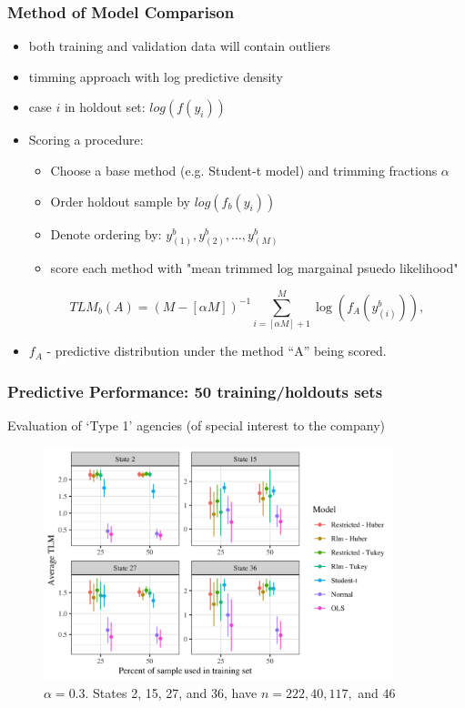 \documentclass{beamer}
\begin{document}
\begin{frame}
	\frametitle{Method of Model Comparison}
\begin{itemize}
	\item both training and validation data will contain outliers
	\item timming approach with log predictive density \citep{jung2014}
	\item case $i$ in holdout set: $log(f(y_i))$
	\item Scoring a procedure:
	\begin{itemize}
		\item Choose a base method (e.g. Student-t model) and trimming fractions $\alpha$
		\item Order holdout sample by $log(f_b(y_i))$
		\item Denote ordering by: $y_{(1)}^b, y_{(2)}^b, \dots, y_{(M)}^b$
		\item score each method with "mean trimmed log margainal psuedo likelihood"
	\end{itemize}
\[TLM_b(A) = (M - [\alpha M])^{-1} \sum_{i=[\alpha M]+1}^{M}
\log(f_A(y_{(i)}^b)),\]
\end{itemize}
\begin{itemize}
	\item $f_A$ - predictive distribution under the method ``A'' being scored. 
\end{itemize}
\end{frame}


\begin{frame}
	\frametitle{Predictive Performance: 50 training/holdouts sets}
Evaluation of `Type 1' agencies (of special interest to the company)
\begin{figure}[t]
	\centering
	\includegraphics[width=4in]{tlm_base_Student-t.png}
	\caption{$\alpha = 0.3$. States 2, 15, 27, and 36, have $n = 222, 40, 117,$ and $46$}
	\label{fig:tlm}
\end{figure}
\end{frame}
\end{document}
